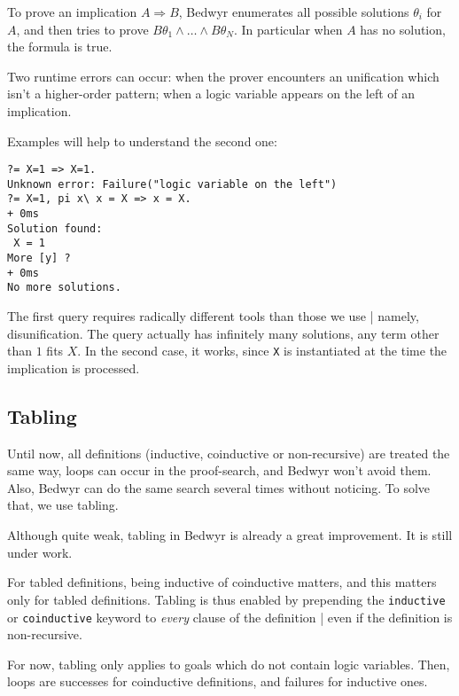 \documentclass{article}
\begin{document}
To prove an implication $A\Rightarrow B$,
Bedwyr enumerates all possible solutions $\theta_i$ for $A$,
and then tries to prove $B\theta_1\wedge\dots\wedge B\theta_N$.
In particular when $A$ has no solution, the formula is true.

Two runtime errors can occur:
when the prover encounters an unification which isn't a higher-order pattern;
when a logic variable appears on the left of an implication.

Examples will help to understand the second one:
\begin{verbatim}
?= X=1 => X=1.
Unknown error: Failure("logic variable on the left")
?= X=1, pi x\ x = X => x = X.
+ 0ms
Solution found:
 X = 1
More [y] ?
+ 0ms
No more solutions.
\end{verbatim}
The first query requires radically different tools than those we use |
namely, disunification. The query actually has infinitely many solutions,
any term other than $1$ fits $X$.
In the second case, it works, since \verb.X. is instantiated at the time the
implication is processed.

\subsection{Tabling}

Until now, all definitions (inductive, coinductive or non-recursive)
are treated the same way, loops can occur in the proof-search, and Bedwyr
won't avoid them. Also, Bedwyr can do the same search several times without
noticing. To solve that, we use tabling.

Although quite weak, tabling in Bedwyr is already a great improvement.
It is still under work.

For tabled definitions, being inductive of coinductive matters, and this 
matters only for tabled definitions.
Tabling is thus enabled by prepending the \texttt{inductive} or
\texttt{coinductive} keyword to \emph{every} clause of the definition |
even if the definition is non-recursive.

For now, tabling only applies to goals which do not contain logic variables.
Then, loops are successes for coinductive definitions,
and failures for inductive ones.
\end{document}
